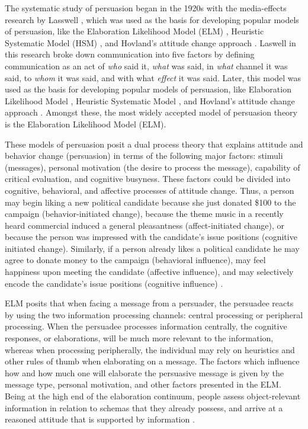 \documentclass[hidelinks,11pt,a4paper]{report}
\renewcommand{\cite}[1]{\citep{#1}}
\begin{document}
The systematic study of persuasion began in the 1920s with the media-effects research by Lasswell \cite{lasswell1971propaganda}, which was used as the basis for developing popular models of persuasion, like the Elaboration Likelihood Model (ELM) \cite{petty1986elaboration}, Heuristic Systematic Model (HSM) \cite{chaiken1980heuristic}, and Hovland's attitude change approach \cite{hovland1953communication}. %
Laswell in this research broke down communication into five factors by defining communication as an act of \textit{who} said it, \textit{what} was said, in \textit{what} channel it was said, to \textit{whom} it was said, and with what \textit{effect} it was said. Later, this model was used as the basis for developing popular models of persuasion, like Elaboration Likelihood Model \cite{petty1986elaboration}, Heuristic Systematic Model \cite{chaiken1980heuristic}, and Hovland's attitude change approach \cite{hovland1953communication}. Amongst these, the most widely accepted model of persuasion theory is the Elaboration Likelihood Model (ELM). 

These models of persuasion posit a dual process theory that explains attitude and behavior change (persuasion) in terms of the following major factors: stimuli (messages), personal motivation (the desire to process the message), capability of critical evaluation, and cognitive busyness. These factors could be divided into cognitive, behavioral, and affective processes of attitude change. 
Thus, a person may begin liking a new political candidate because she just donated \$100 to the campaign (behavior-initiated change), because the theme music in a recently heard commercial induced a general pleasantness (affect-initiated change), or because the person was impressed with the candidate’s issue positions (cognitive initiated change). Similarly, if a person already likes a political candidate he may agree to donate money to the campaign (behavioral influence), may feel happiness upon meeting the candidate (affective influence), and may selectively encode the candidate’s issue positions (cognitive influence) \cite{petty1986elaboration}.

ELM posits that when facing a message from a persuader, the persuadee reacts by using the two information processing channels: central processing or peripheral processing. When the persuadee processes information centrally, the cognitive responses, or elaborations, will be much more relevant to the information, whereas when processing peripherally, the individual may rely on heuristics and other rules of thumb when elaborating on a message. The factors which influence how and how much one will elaborate the persuasive message is given by the message type, personal motivation, and other factors presented in the ELM. Being at the high end of the elaboration continuum, people assess object-relevant information in relation to schemas that they already possess, and arrive at a reasoned attitude that is supported by information \cite{van2011handbook}. 
\end{document}
